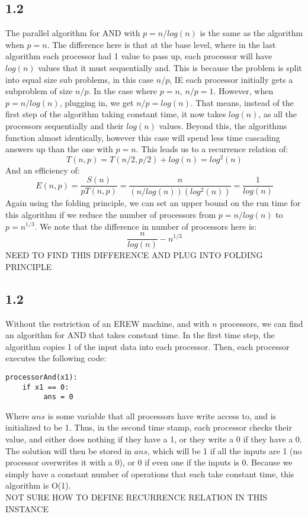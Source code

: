 \documentclass[letterpaper,notitlepage,twoside]{article}
\begin{document}
\subsection*{1.2}
The parallel algorithm for AND with $p=n/log(n)$ is the same as the algorithm when $p=n$. The difference here is that at the base level, where in the last algorithm each processor had 1 value to pass up, each processor will have $log(n)$ values that it must sequentially and. This is because the problem is split into equal size sub problems, in this case $n/p$, IE each processor initially gets a subproblem of size $n/p$. In the case where $p=n$, $n/p = 1$. However, when $p=n/log(n)$, plugging in, we get $n/p = log(n)$. That means, instead of the first step of the algorithm taking constant time, it now takes $log(n)$, as all the processors sequentially and their $log(n)$ values. Beyond this, the algorithms function almost identically, however this case will spend less time cascading answers up than the one with $p=n$. This leads us to a recurrence relation of:
$$T(n, p) = T(n/2, p/2) + log(n) = log^2(n)$$
And an efficiency of:
$$ E(n, p) = \frac{S(n)}{pT(n, p)} = \frac{n}{(n/log(n))(log^2(n))} = \frac{1}{log(n)}$$ 
Again using the folding principle, we can set an upper bound on the run time for this algorithm if we reduce the number of processors from $p=n/log(n)$ to $p=n^{1/3}$. We note that the difference in number of processors here is:
$$\frac{n}{log(n)} - n^{1/3}$$
NEED TO FIND THIS DIFFERENCE AND PLUG INTO FOLDING PRINCIPLE\\
\subsection*{1.2}
Without the restriction of an EREW machine, and with $n$ processors, we can find an algorithm for AND that takes constant time. In the first time step, the algorithm copies 1 of the input data into each processor. Then, each processor executes the following code:
\begin{verbatim}
processorAnd(x1):
    if x1 == 0:
         ans = 0 
\end{verbatim}
Where $ans$ is some variable that all processors have write access to, and is initialized to be 1. Thus, in the second time stamp, each processor checks their value, and either does nothing if they have a 1, or they write a 0 if they have a 0. The solution will then be stored in $ans$, which will be 1 if all the inputs are 1 (no processor overwrites it with a 0), or 0 if even one if the inputs is 0. Because we simply have a constant number of operations that each take constant time, this algorithm is O(1). \\
NOT SURE HOW TO DEFINE RECURRENCE RELATION IN THIS INSTANCE
\end{document}
